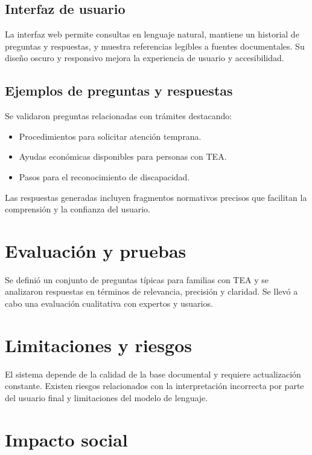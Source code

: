 \documentclass[a4paper,12pt]{article}
\begin{document}
\subsection{Interfaz de usuario}

La interfaz web permite consultas en lenguaje natural, mantiene un historial de preguntas y respuestas, y muestra referencias legibles a fuentes documentales. Su diseño oscuro y responsivo mejora la experiencia de usuario y accesibilidad.

\subsection{Ejemplos de preguntas y respuestas}

Se validaron preguntas relacionadas con trámites destacando:

\begin{itemize}
    \item Procedimientos para solicitar atención temprana.
    \item Ayudas económicas disponibles para personas con TEA.
    \item Pasos para el reconocimiento de discapacidad.
\end{itemize}

Las respuestas generadas incluyen fragmentos normativos precisos que facilitan la comprensión y la confianza del usuario.

\section{Evaluación y pruebas}

Se definió un conjunto de preguntas típicas para familias con TEA y se analizaron respuestas en términos de relevancia, precisión y claridad. Se llevó a cabo una evaluación cualitativa con expertos y usuarios.

\section{Limitaciones y riesgos}

El sistema depende de la calidad de la base documental y requiere actualización constante. Existen riesgos relacionados con la interpretación incorrecta por parte del usuario final y limitaciones del modelo de lenguaje.

\section{Impacto social}
\end{document}
